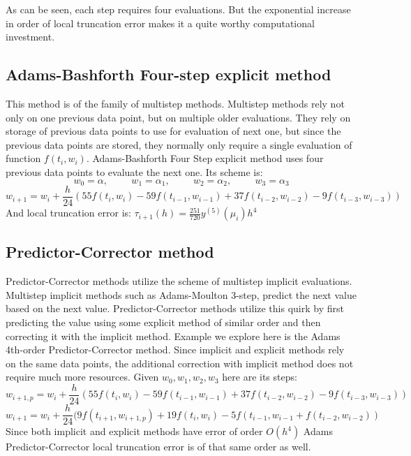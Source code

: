 \documentclass[11pt]{article}	%
\begin{document}
As can be seen, each step requires four evaluations. But the exponential increase in order of 
local truncation error makes it a quite worthy computational investment. 

\subsection{Adams-Bashforth Four-step explicit method}
This method is of the family of multistep methods. Multistep methods rely not only on one previous data point, but on multiple older evaluations. They rely on storage of previous data points to use for evaluation of next one, but since the previous data points are stored, they normally only require a single evaluation of function $f(t_i,w_i)$. Adams-Bashforth Four Step explicit method uses four previous data points to evaluate the next one. Its scheme is:
$$w_0 = \alpha , \hspace{1cm} w_1 = \alpha _1, \hspace{1cm} w_2 = \alpha _2, \hspace{1cm} w_3 = \alpha _3$$
$$w_{i+1} = w_i + \frac{h}{24}(55f(t_i,w_i) - 59f(t_{i-1}, w_{i-1}) + 37f(t_{i-2}, w_{i-2}) - 9f(t_{i-3}, w_{i-3}))$$
And local truncation error is: $\tau _{i+1}(h) = \frac{251}{720}y^{(5)}(\mu _i)h^4$

\subsection{Predictor-Corrector method}
Predictor-Corrector methods utilize the scheme of multistep implicit evaluations. Multistep implicit methods such as Adams-Moulton 3-step, predict the next value based on the next value. 
Predictor-Corrector methods utilize this quirk by first predicting the value using some explicit 
method of similar order and then correcting it with the implicit method. Example we explore here is
the Adams 4th-order Predictor-Corrector method. Since implicit and explicit methods rely on the same data points, the additional correction with implicit method does not require much more
resources. Given $w_0, w_1, w_2, w_3$ here are its steps: 
$$w_{i+1,p} = w_i + \frac{h}{24}(55f(t_i,w_i) - 59f(t_{i-1}, w_{i-1}) + 37f(t_{i-2}, w_{i-2}) - 9f(t_{i-3}, w_{i-3}))$$
$$w_{i+1} = w_i + \frac{h}{24}(9f(t_{i+1}, w_{i+1, p}) + 19f(t_i, w_i) - 5f(t_{i-1}, w_{i-1} + f(t_{i-2}, w_{i-2}))$$
Since both implicit and explicit methods have error of order $O(h^4)$ Adams Predictor-Corrector local truncation error is of that same order as well. 
\end{document}
